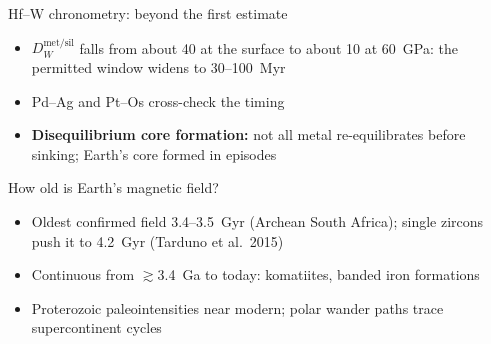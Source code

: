 \documentclass[aspectratio=169, 11pt]{beamer}
\begin{document}
\begin{frame}
\end{frame}

\begin{frame}{Hf--W chronometry: beyond the first estimate}
  \begin{itemize}\setlength\itemsep{4pt}
    \item $D_W^{\mathrm{met/sil}}$ falls from about 40 at the surface to about 10 at 60~GPa: the permitted window widens to 30--100~Myr
    \item Pd--Ag and Pt--Os cross-check the timing
    \item \textbf{Disequilibrium core formation:} not all metal re-equilibrates before sinking; Earth's core formed in episodes
  \end{itemize}
  \vskip8pt
\end{frame}

\begin{frame}{How old is Earth's magnetic field?}
  \begin{itemize}\setlength\itemsep{4pt}
    \item Oldest confirmed field 3.4--3.5~Gyr (Archean South Africa); single zircons push it to 4.2~Gyr (Tarduno et al.\ 2015)
    \item Continuous from $\gtrsim$3.4~Ga to today: komatiites, banded iron formations
    \item Proterozoic paleointensities near modern; polar wander paths trace supercontinent cycles
  \end{itemize}
  \vskip8pt
\end{frame}

\end{document}
